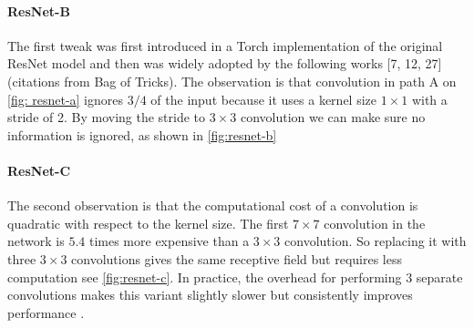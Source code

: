 \paragraph{ResNet-B}
The first tweak was first introduced in a Torch implementation of the original ResNet model and then was widely adopted by the following works [7, 12, 27] (citations from Bag of Tricks). The observation is that convolution in path A on \autoref{fig: resnet-a} ignores $3/4$ of the input because it uses a kernel size $1 \times 1$ with a stride of 2. By moving the stride to $3 \times 3$ convolution we can make sure no information is ignored, as shown in \autoref{fig:resnet-b}



\paragraph{ResNet-C}
The second observation is that the computational cost of a convolution is quadratic with respect to the kernel size. The first $7 \times 7$ convolution in the network is $5.4$ times more expensive than a $3 \times 3 $ convolution. So replacing it with three $3 \times 3 $ convolutions gives the same receptive field but requires less computation see \autoref{fig:resnet-c}. In practice, the overhead for performing 3 separate convolutions makes this variant slightly slower but consistently improves performance \cite{he2019_bag_of_tricks}. 



